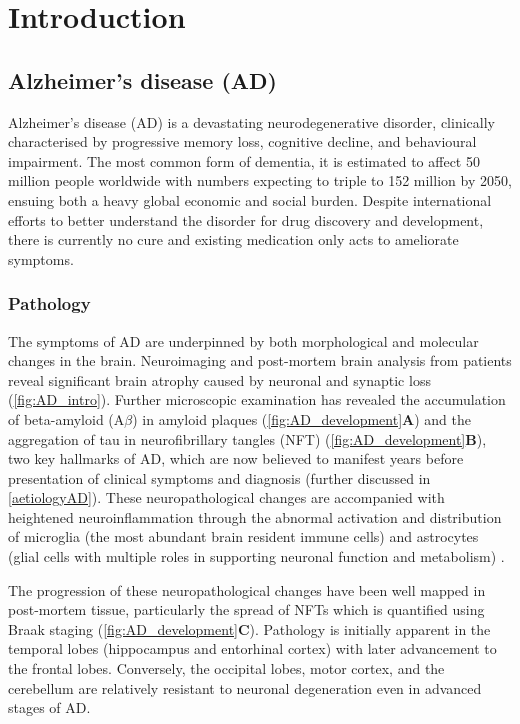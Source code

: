 \chapter{Introduction}

\section{Alzheimer's disease (AD)}

Alzheimer’s disease (AD) is a devastating neurodegenerative disorder, clinically characterised by progressive memory loss, cognitive decline, and behavioural impairment. The most common form of dementia, it is estimated to affect 50 million people worldwide with numbers expecting to triple to 152 million by 2050, ensuing both a heavy global economic and social burden\cite{International2020}. Despite international efforts to better understand the disorder for drug discovery and development, there is currently no cure and existing medication only acts to ameliorate symptoms.

\subsection{Pathology}
The symptoms of AD are underpinned by both morphological and molecular changes in the brain. Neuroimaging and post-mortem brain analysis from patients reveal significant brain atrophy caused by neuronal and synaptic loss\cite{Selkoe1991,Perl2010} (\cref{fig:AD_intro}). Further microscopic examination has revealed the accumulation of beta-amyloid (A$\beta$) in amyloid plaques (\cref{fig:AD_development}\textbf{A}) and the aggregation of tau in neurofibrillary tangles (NFT) (\cref{fig:AD_development}\textbf{B}), two key hallmarks of AD, which are now believed to manifest years before presentation of clinical symptoms and diagnosis \cite{Sperling2011} (further discussed in \cref{aetiologyAD}). These neuropathological changes are accompanied with heightened neuroinflammation through the abnormal activation and distribution of microglia (the most abundant brain resident immune cells) and astrocytes (glial cells with multiple roles in supporting neuronal function and metabolism) \cite{Heneka2015}. 

The progression of these neuropathological changes have been well mapped in post-mortem tissue, particularly the spread of NFTs which is quantified using Braak staging\cite{H1991} (\cref{fig:AD_development}\textbf{C}). Pathology is initially apparent in the temporal lobes (hippocampus and entorhinal cortex) with later advancement to the frontal lobes. Conversely, the occipital lobes, motor cortex, and the cerebellum are relatively resistant to neuronal degeneration even in advanced stages of AD\cite{Xu2019}.

